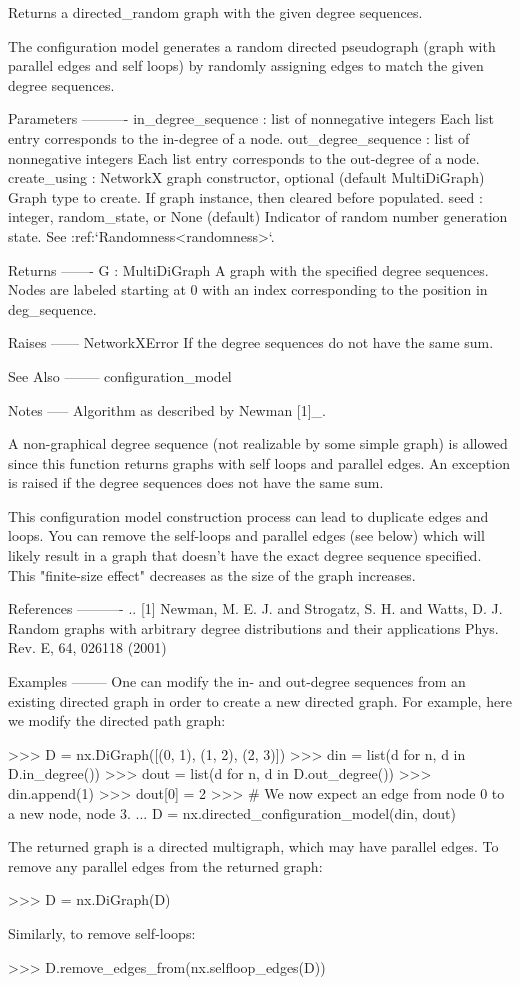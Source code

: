 \begin{DoxyVerb}Returns a directed_random graph with the given degree sequences.

The configuration model generates a random directed pseudograph
(graph with parallel edges and self loops) by randomly assigning
edges to match the given degree sequences.

Parameters
----------
in_degree_sequence :  list of nonnegative integers
   Each list entry corresponds to the in-degree of a node.
out_degree_sequence :  list of nonnegative integers
   Each list entry corresponds to the out-degree of a node.
create_using : NetworkX graph constructor, optional (default MultiDiGraph)
    Graph type to create. If graph instance, then cleared before populated.
seed : integer, random_state, or None (default)
    Indicator of random number generation state.
    See :ref:`Randomness<randomness>`.

Returns
-------
G : MultiDiGraph
    A graph with the specified degree sequences.
    Nodes are labeled starting at 0 with an index
    corresponding to the position in deg_sequence.

Raises
------
NetworkXError
    If the degree sequences do not have the same sum.

See Also
--------
configuration_model

Notes
-----
Algorithm as described by Newman [1]_.

A non-graphical degree sequence (not realizable by some simple
graph) is allowed since this function returns graphs with self
loops and parallel edges.  An exception is raised if the degree
sequences does not have the same sum.

This configuration model construction process can lead to
duplicate edges and loops.  You can remove the self-loops and
parallel edges (see below) which will likely result in a graph
that doesn't have the exact degree sequence specified.  This
"finite-size effect" decreases as the size of the graph increases.

References
----------
.. [1] Newman, M. E. J. and Strogatz, S. H. and Watts, D. J.
   Random graphs with arbitrary degree distributions and their applications
   Phys. Rev. E, 64, 026118 (2001)

Examples
--------
One can modify the in- and out-degree sequences from an existing
directed graph in order to create a new directed graph. For example,
here we modify the directed path graph:

>>> D = nx.DiGraph([(0, 1), (1, 2), (2, 3)])
>>> din = list(d for n, d in D.in_degree())
>>> dout = list(d for n, d in D.out_degree())
>>> din.append(1)
>>> dout[0] = 2
>>> # We now expect an edge from node 0 to a new node, node 3.
... D = nx.directed_configuration_model(din, dout)

The returned graph is a directed multigraph, which may have parallel
edges. To remove any parallel edges from the returned graph:

>>> D = nx.DiGraph(D)

Similarly, to remove self-loops:

>>> D.remove_edges_from(nx.selfloop_edges(D))\end{DoxyVerb}

